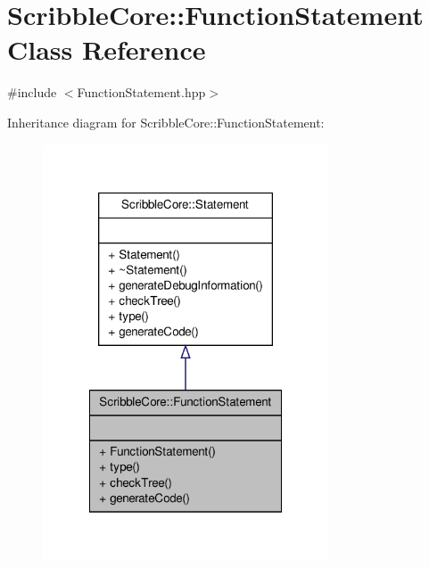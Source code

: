 \hypertarget{class_scribble_core_1_1_function_statement}{\section{Scribble\-Core\-:\-:Function\-Statement Class Reference}
\label{class_scribble_core_1_1_function_statement}
}


{\ttfamily \#include $<$Function\-Statement.\-hpp$>$}



Inheritance diagram for Scribble\-Core\-:\-:Function\-Statement\-:
\nopagebreak
\begin{figure}[H]
\begin{center}
\leavevmode
\includegraphics[width=240pt]{class_scribble_core_1_1_function_statement__inherit__graph}
\end{center}
\end{figure}


